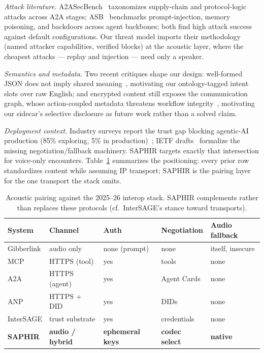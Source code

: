\documentclass[11pt]{article}
\begin{document}
\emph{Attack literature.} A2ASecBench~\cite{a2asecbench} taxonomizes
supply-chain and protocol-logic attacks across A2A stages; ASB~\cite{asb} benchmarks
prompt-injection, memory poisoning, and backdoors across agent backbones; both
find high attack success against default configurations. Our threat model
imports their methodology (named attacker capabilities, verified blocks) at the
acoustic layer, where the cheapest attacks --- replay and injection --- need
only a speaker.

\emph{Semantics and metadata.} Two recent critiques shape our design:
well-formed JSON does not imply shared meaning~\cite{semalign}, motivating our
ontology-tagged intent slots over raw English; and encrypted content still
exposes the communication graph, whose action-coupled metadata threatens
workflow integrity~\cite{graphmeta}, motivating our sidecar's selective
disclosure as future work rather than a solved claim.

\emph{Deployment context.} Industry surveys report the trust gap blocking
agentic-AI production (85\% exploring, 5\% in production)~\cite{ciscotrust};
IETF drafts~\cite{ietf-agents} formalize the missing negotiation/fallback
machinery. SAPHIR targets exactly that intersection for voice-only encounters.
Table~\ref{tab:stack} summarizes the positioning: every prior row standardizes
content while assuming IP transport; SAPHIR is the pairing layer for the one
transport the stack omits.

\begin{table}[h]
\centering\small
\caption{Acoustic pairing against the 2025--26 interop stack. SAPHIR complements
rather than replaces these protocols (cf.\ InterSAGE's stance toward transports).}
\label{tab:stack}
\begin{tabular}{@{}lllll@{}}
\toprule
System & Channel & Auth & Negotiation & Audio fallback \\
\midrule
Gibberlink & audio only & none (prompt) & none & itself, insecure \\
MCP & HTTPS (tool) & yes & tools & none \\
A2A & HTTPS (agent) & yes & Agent Cards & none \\
ANP & HTTPS + DID & yes & DIDs & none \\
InterSAGE & trust substrate & yes & credentials & none \\
\textbf{SAPHIR} & \textbf{audio / hybrid} & \textbf{ephemeral keys} & \textbf{codec select} & \textbf{native} \\
\bottomrule
\end{tabular}
\end{table}
\end{document}
